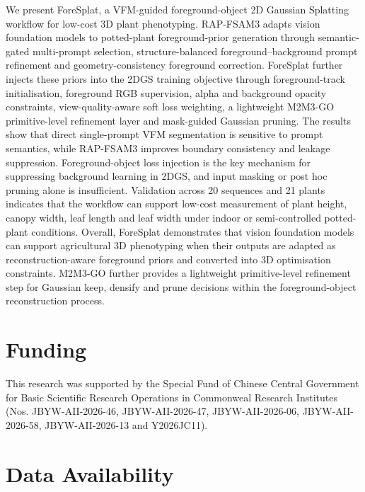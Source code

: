 \documentclass[a4paper]{cas-sc}
\begin{document}
We present ForeSplat, a VFM-guided foreground-object 2D Gaussian Splatting workflow for low-cost 3D plant phenotyping. RAP-FSAM3 adapts vision foundation models to potted-plant foreground-prior generation through semantic-gated multi-prompt selection, structure-balanced foreground--background prompt refinement and geometry-consistency foreground correction. ForeSplat further injects these priors into the 2DGS training objective through foreground-track initialisation, foreground RGB supervision, alpha and background opacity constraints, view-quality-aware soft loss weighting, a lightweight M2M3-GO primitive-level refinement layer and mask-guided Gaussian pruning. The results show that direct single-prompt VFM segmentation is sensitive to prompt semantics, while RAP-FSAM3 improves boundary consistency and leakage suppression. Foreground-object loss injection is the key mechanism for suppressing background learning in 2DGS, and input masking or post hoc pruning alone is insufficient. Validation across 20 sequences and 21 plants indicates that the workflow can support low-cost measurement of plant height, canopy width, leaf length and leaf width under indoor or semi-controlled potted-plant conditions. Overall, ForeSplat demonstrates that vision foundation models can support agricultural 3D phenotyping when their outputs are adapted as reconstruction-aware foreground priors and converted into 3D optimisation constraints. M2M3-GO further provides a lightweight primitive-level refinement step for Gaussian keep, densify and prune decisions within the foreground-object reconstruction process.

\section*{Funding}

This research was supported by the Special Fund of Chinese Central Government for Basic Scientific Research Operations in Commonweal Research Institutes (Nos. JBYW-AII-2026-46, JBYW-AII-2026-47, JBYW-AII-2026-06, JBYW-AII-2026-58, JBYW-AII-2026-13 and Y2026JC11).

\section*{Data Availability}
\end{document}
